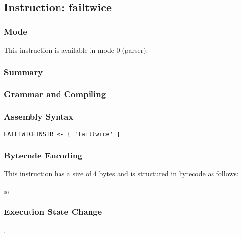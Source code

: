 \subsection{Instruction: failtwice}

\subsubsection{Mode}
This instruction is available in mode 0 (parser).
\subsubsection{Summary}


\subsubsection{Grammar and Compiling}


\subsubsection{Assembly Syntax}

\begin{myquote}
\begin{verbatim}
FAILTWICEINSTR <- { 'failtwice' }
\end{verbatim}
\end{myquote}

\subsubsection{Bytecode Encoding}

This instruction has a size of 4 bytes and is structured in bytecode as follows:

$_{00}$\ 


\subsubsection{Execution State Change}

.


